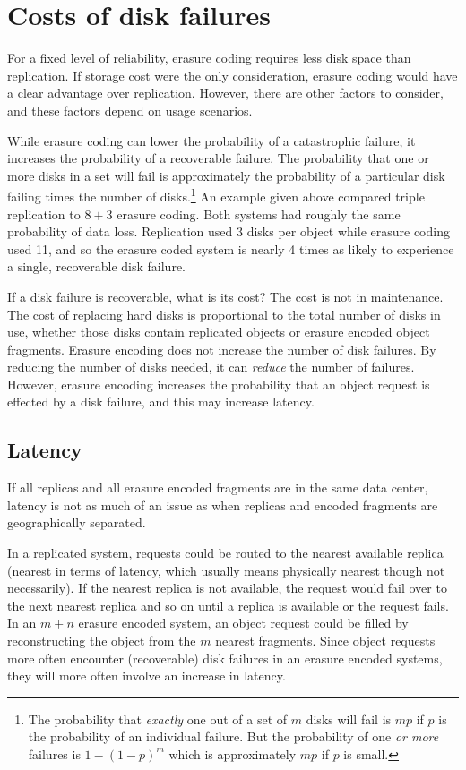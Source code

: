 \documentclass[11pt]{article}
\begin{document}
\section{Costs of disk failures}

For a fixed level of reliability, erasure coding requires less disk space than replication. If storage cost were the only consideration, erasure coding would have a clear advantage over replication. However, there are other factors to consider, and these factors depend on usage scenarios.

While erasure coding can lower the probability of a catastrophic failure, it increases the probability of a recoverable failure. The probability that one or more disks in a set will fail is approximately the probability of a particular disk failing times the number of disks.\footnote{The probability that \emph{exactly} one out of a set of $m$ disks will fail is $mp$ if $p$ is the probability of an individual failure. But the probability of one \emph{or more} failures is $1-(1-p)^m$ which is approximately $mp$ if $p$ is small.} An example given above compared triple replication to $8+3$ erasure coding. Both systems had roughly the same probability of data loss. Replication used 3 disks per object while erasure coding used 11, and so the erasure coded system is nearly 4 times as likely to experience a single, recoverable disk failure.

If a disk failure is recoverable, what is its cost? The cost is not in maintenance. The cost of replacing hard disks is proportional to the total number of disks in use, whether those disks contain replicated objects or erasure encoded object fragments. Erasure encoding does not increase the number of disk failures. By reducing the number of disks needed, it can \emph{reduce} the number of failures. However, erasure encoding increases the probability that an object request is effected by a disk failure, and this may increase latency.

\subsection{Latency}

If all replicas and all erasure encoded fragments are in the same data center, latency is not as much of an issue as when replicas and encoded fragments are geographically separated. 

In a replicated system, requests could be routed to the nearest available replica (nearest in terms of latency, which usually means physically nearest though not necessarily). If the nearest replica is not available, the request would fail over to the next nearest replica and so on until a replica is available or the request fails. In an $m+n$ erasure encoded system, an object request could be filled by reconstructing the object from the $m$ nearest fragments. Since object requests more often encounter (recoverable) disk failures in an erasure encoded systems, they will more often involve an increase in latency.
\end{document}
